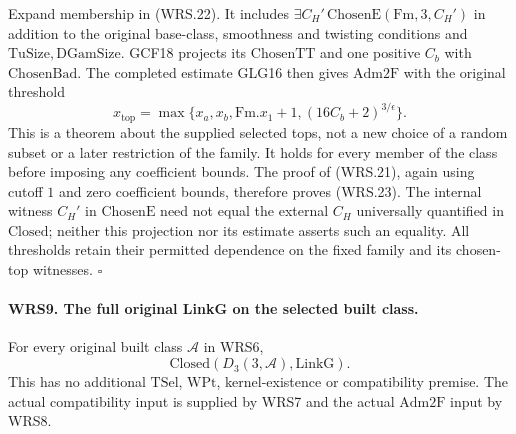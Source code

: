 Expand membership in (WRS.22).  It includes
\(\exists C_H'\,\mathrm{ChosenE}(\mathrm{Fm},3,C_H')\)
in addition to the original base-class, smoothness and twisting
conditions and \(\mathrm{TuSize},\mathrm{DGamSize}\).
GCF18 projects its \(\mathrm{ChosenTT}\) and one positive
\(C_b\) with \(\mathrm{ChosenBad}\).  The completed estimate
GLG16 then gives \(\mathrm{Adm2F}\) with the original threshold
\[
 x_{\mathrm{top}}=
 \max\{x_a,x_b,\mathrm{Fm}.x_1+1,
                         (16C_b+2)^{3/\epsilon}\}.
 \tag{WRS.24}
\]
This is a theorem about the supplied selected tops, not a new
choice of a random subset or a later restriction of the family.
It holds for every member of the class before imposing any
coefficient bounds.  The proof of (WRS.21), again using cutoff
\(1\) and zero coefficient bounds, therefore proves (WRS.23).
The internal witness \(C_H'\) in \(\mathrm{ChosenE}\) need
not equal the external \(C_H\) universally quantified in
\(\mathrm{Closed}\); neither this projection nor its estimate
asserts such an equality.  All thresholds retain their permitted
dependence on the fixed family and its chosen-top witnesses.
\hfill\(\square\)

\paragraph{WRS9. The full original LinkG on the selected built class.}
\label{claim:WRS9}
For every original built class \(\mathcal A\) in WRS6,
\[
             \mathrm{Closed}(D_3(3,\mathcal A),\mathrm{LinkG}).
 \tag{WRS.25}
\]
This has no additional \(\mathrm{TSel}\), \(\mathrm{WPt}\),
kernel-existence or compatibility premise.  The actual compatibility
input is supplied by WRS7 and the actual \(\mathrm{Adm2F}\)
input by WRS8.

